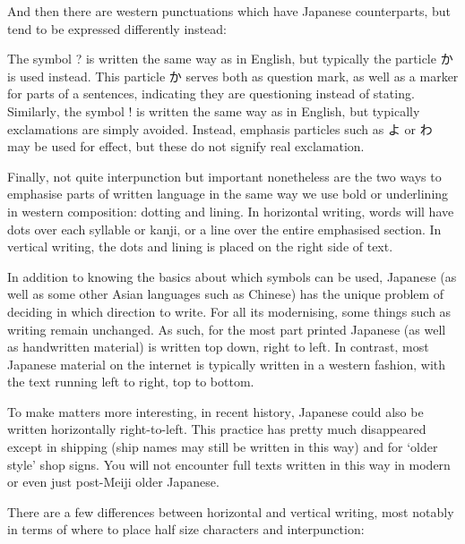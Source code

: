 \documentclass[11pt, b5paper, twoside, openright, onecolumn]{book}
\begin{document}
And then there are western punctuations which have Japanese counterparts‚ but tend to be expressed differently instead:

The symbol ? is written the same way as in English‚ but typically the particle か is used instead. This particle か serves both as question mark‚ as well as a marker for parts of a sentences‚ indicating they are questioning instead of stating. Similarly‚ the symbol ! is written the same way as in English‚ but typically exclamations are simply avoided. Instead‚ emphasis particles such as よ or わ may be used for effect‚ but these do not signify real exclamation.

Finally‚ not quite interpunction but important nonetheless are the two ways to emphasise parts of written language in the same way we use bold or underlining in western composition: dotting and lining. In horizontal writing‚ words will have dots over each syllable or kanji‚ or a line over the entire emphasised section. In vertical writing‚ the dots and lining is placed on the right side of text.

In addition to knowing the basics about which symbols can be used‚ Japanese (as well as some other Asian languages such as Chinese) has the unique problem of deciding in which direction to write. For all its modernising‚ some things such as writing remain unchanged. As such‚ for the most part printed Japanese (as well as handwritten material) is written top down‚ right to left. In contrast‚ most Japanese material on the internet is typically written in a western fashion‚ with the text running left to right‚ top to bottom.

To make matters more interesting‚ in recent history‚ Japanese could also be written horizontally right-to-left. This practice has pretty much disappeared except in shipping (ship names may still be written in this way) and for ‘older style’ shop signs. You will not encounter full texts written in this way in modern or even just post-Meiji older Japanese.

There are a few differences between horizontal and vertical writing‚ most notably in terms of where to place half size characters and interpunction:
\end{document}
